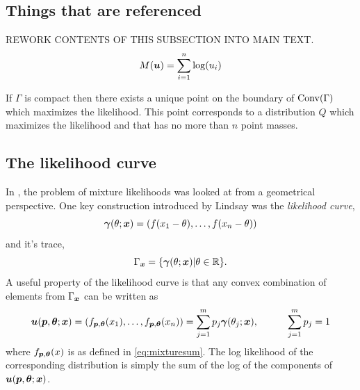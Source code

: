 	\subsection{Things that are referenced}
	REWORK CONTENTS OF THIS SUBSECTION INTO MAIN TEXT.
	\begin{equation}
		M({\bm{{u}}}) = \sum_{i=1}^n \log(u_i)
		\label{eq:transformedlikelihood}
	\end{equation}

	\begin{theorem}
		If $\Gamma$ is compact then there exists a unique point on the boundary of $\mathrm{Conv}(\Gamma)$ which maximizes the likelihood. This point corresponds to a distribution $Q$ which maximizes the likelihood and that has no more than $n$ point masses.
		\label{thm:LindsayGamma}
	\end{theorem}

	\subsection{The likelihood curve}
		In \cite{Lindsay1983-tf}, the problem of mixture likelihoods was looked at from a geometrical perspective. One key construction introduced by Lindsay was the \emph{likelihood curve},
		\begin{equation}
			{\bm{{\gamma}}}(\theta;{\bm{{x}}}) = (f(x_{1}-\theta),\dots,f(x_{n}-\theta))
			\label{eq:Gamma}
		\end{equation}
		and it's trace,
		\begin{equation}
			\Gamma_{{\bm{{x}}}} = \{{\bm{{\gamma}}}(\theta;{\bm{{x}}})| \theta \in \mathbb{R}\}.
		\end{equation}
		A useful property of the likelihood curve is that any convex combination of elements from $\Gamma_{{\bm{{x}}}}$ can be written as
		\begin{equation}
			{\bm{{u}}}({\bm{{p}}},{\bm{{\theta}}};{\bm{{x}}}) = (f_{{\bm{{p}}},{\bm{{\theta}}}}(x_{1}),\dots,f_{{\bm{{p}}},{\bm{{\theta}}}}(x_{n})) = \sum_{j = 1}^m p_j {\bm{{\gamma}}}(\theta_j;{\bm{{x}}}), \hspace{30pt} \sum_{j=1}^m p_j = 1
			\label{eq:convexcombinationgamma}
		\end{equation}
		where $f_{{\bm{{p}}},{\bm{{\theta}}}}(x)$ is as defined in \eqref{eq:mixturesum}. The log likelihood of the corresponding distribution is simply the sum of the log of the components of ${\bm{{u}}}({\bm{{p}}},{\bm{{\theta}}};{\bm{{x}}})$.
		
